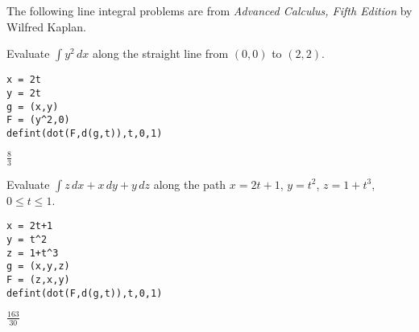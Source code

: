 \bigskip
\noindent
The following line integral problems are from
{\it Advanced Calculus, Fifth Edition} by Wilfred Kaplan.

\bigskip
\noindent
Evaluate $\int y^2\,dx$ along the straight
line from $(0,0)$ to $(2,2)$.

\begin{Verbatim}[formatcom=\color{blue},samepage=true]
x = 2t
y = 2t
g = (x,y)
F = (y^2,0)
defint(dot(F,d(g,t)),t,0,1)
\end{Verbatim}

\noindent
$\displaystyle \tfrac{8}{3}$

\bigskip
\noindent
Evaluate $\int z\,dx+x\,dy+y\,dz$
along the path
$x=2t+1$, $y=t^2$, $z=1+t^3$, $0\le t\le 1$.

\begin{Verbatim}[formatcom=\color{blue},samepage=true]
x = 2t+1
y = t^2
z = 1+t^3
g = (x,y,z)
F = (z,x,y)
defint(dot(F,d(g,t)),t,0,1)
\end{Verbatim}

\noindent
$\displaystyle \tfrac{163}{30}$
